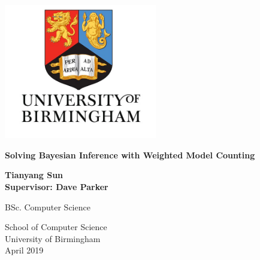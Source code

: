 \begin{titlepage}
    \begin{center}
        \includegraphics[width=0.5\textwidth]{pic/Bham_withname.jpg}
        \vspace*{2cm}
 
        \Huge
        \textbf{Solving Bayesian Inference with Weighted Model Counting}
 
        \vspace{0.5cm}
        
        \vspace{1.5cm}
        \Large
        \textbf{Tianyang Sun}\\
        \textbf{Supervisor: Dave Parker}
        \vspace{2.5cm}
 
        BSc. Computer Science
 
        \vspace{1.0 cm}
 
        \Large
        School of Computer Science\\
        University of Birmingham\\
        April 2019
 
    \end{center}
\end{titlepage}
